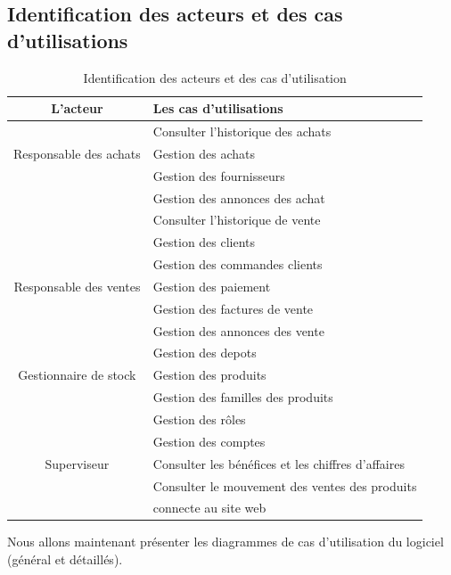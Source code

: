 \documentclass[edit,12pt,a4paper,ChapStyle,oneside,doubleinterligne]{report}
\begin{document}
\subsection{Identification des acteurs et des cas d'utilisations}
\begin{table}[h!]
    \centering
    \begin{tabular}{|c|l|}
    \hline
        L’acteur                  &  Les cas d’utilisations\\ \hline
                                  & Consulter l'historique des achats\\
        Responsable des achats    & Gestion des achats\\
                                  & Gestion des fournisseurs\\ 
                                  & Gestion des annonces  des achat\\\hline
                                  & Consulter l'historique de vente\\
                                  & Gestion des clients\\
                                  & Gestion des commandes clients\\
        Responsable des ventes    & Gestion des paiement\\
                                  & Gestion des factures de vente\\
                                  & Gestion des annonces des vente\\ \hline
                                  & Gestion des depots\\ 
         Gestionnaire de stock    & Gestion des produits\\
                                  & Gestion des familles des produits\\\hline
                                  & Gestion des rôles\\
                                  & Gestion des comptes \\ 
        Superviseur               & Consulter les bénéfices et les chiffres d'affaires\\
                                  & Consulter le mouvement des ventes des produits\\
                                  & connecte au site web  \\\hline
    \end{tabular}
    \caption{Identification des acteurs et des cas d'utilisation}
    \label{tab:Identification des cas d’utilisations}
\end{table}
Nous allons maintenant présenter les diagrammes de cas d'utilisation du logiciel (général et détaillés).
\newpage
\end{document}
